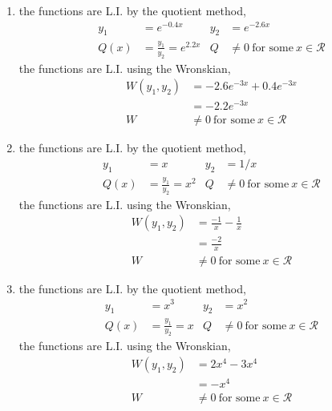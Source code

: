 \begin{enumerate}
    \item the functions are L.I. by the quotient method,
          \begin{align}
              y_{1} & = e^{-0.4x}                                &
              y_{2} & = e^{-2.6x}                                  \\
              Q(x)  & = \frac{y_{1}}{y_{2}} = e^{2.2x}           &
              Q     & \neq 0\ \text{for some}\ x \in \mathcal{R}
          \end{align}
          the functions are L.I. using the Wronskian,
          \begin{align}
              W(y_{1}, y_{2}) & = -2.6e^{-3x} + 0.4e^{-3x}                 \\
                              & = -2.2e^{-3x}                              \\
              W               & \neq 0\ \text{for some}\ x \in \mathcal{R}
          \end{align}

    \item the functions are L.I. by the quotient method,
          \begin{align}
              y_{1} & = x                                        &
              y_{2} & = 1/x                                        \\
              Q(x)  & = \frac{y_{1}}{y_{2}} = x^{2}              &
              Q     & \neq 0\ \text{for some}\ x \in \mathcal{R}
          \end{align}
          the functions are L.I. using the Wronskian,
          \begin{align}
              W(y_{1}, y_{2}) & = \frac{-1}{x} - \frac{1}{x}               \\
                              & =\frac{-2}{x}                              \\
              W               & \neq 0\ \text{for some}\ x \in \mathcal{R}
          \end{align}

    \item the functions are L.I. by the quotient method,
          \begin{align}
              y_{1} & = x^{3}                                    &
              y_{2} & = x^{2}                                      \\
              Q(x)  & = \frac{y_{1}}{y_{2}} = x                  &
              Q     & \neq 0\ \text{for some}\ x \in \mathcal{R}
          \end{align}
          the functions are L.I. using the Wronskian,
          \begin{align}
              W(y_{1}, y_{2}) & = 2x^{4} - 3x^{4}                          \\
                              & = -x^{4}                                   \\
              W               & \neq 0\ \text{for some}\ x \in \mathcal{R}
          \end{align}


\end{enumerate}
